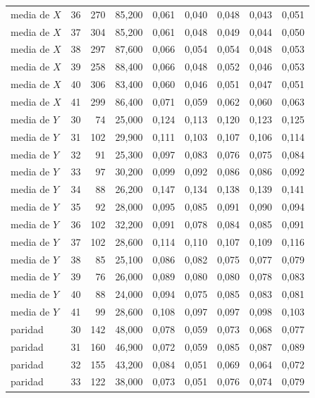 \begin{table}[htbp]
{\begin{tabular}{@{}lrrrrrrrr@{}}
        media de $X$ & 36 & 270 & 85,200 & 0,061 & 0,040 & 0,048 & 0,043 & 0,051 \\
        media de $X$ & 37 & 304 & 85,200 & 0,061 & 0,048 & 0,049 & 0,044 & 0,050 \\
        media de $X$ & 38 & 297 & 87,600 & 0,066 & 0,054 & 0,054 & 0,048 & 0,053 \\
        media de $X$ & 39 & 258 & 88,400 & 0,066 & 0,048 & 0,052 & 0,046 & 0,053 \\
        media de $X$ & 40 & 306 & 83,400 & 0,060 & 0,046 & 0,051 & 0,047 & 0,051 \\
        media de $X$ & 41 & 299 & 86,400 & 0,071 & 0,059 & 0,062 & 0,060 & 0,063 \\
        media de $Y$ & 30 & 74 & 25,000 & 0,124 & 0,113 & 0,120 & 0,123 & 0,125 \\
        media de $Y$ & 31 & 102 & 29,900 & 0,111 & 0,103 & 0,107 & 0,106 & 0,114 \\
        media de $Y$ & 32 & 91 & 25,300 & 0,097 & 0,083 & 0,076 & 0,075 & 0,084 \\
        media de $Y$ & 33 & 97 & 30,200 & 0,099 & 0,092 & 0,086 & 0,086 & 0,092 \\
        media de $Y$ & 34 & 88 & 26,200 & 0,147 & 0,134 & 0,138 & 0,139 & 0,141 \\
        media de $Y$ & 35 & 92 & 28,000 & 0,095 & 0,085 & 0,091 & 0,090 & 0,094 \\
        media de $Y$ & 36 & 102 & 32,200 & 0,091 & 0,078 & 0,084 & 0,085 & 0,091 \\
        media de $Y$ & 37 & 102 & 28,600 & 0,114 & 0,110 & 0,107 & 0,109 & 0,116 \\
        media de $Y$ & 38 & 85 & 25,100 & 0,086 & 0,082 & 0,075 & 0,077 & 0,079 \\
        media de $Y$ & 39 & 76 & 26,000 & 0,089 & 0,080 & 0,080 & 0,078 & 0,083 \\
        media de $Y$ & 40 & 88 & 24,000 & 0,094 & 0,075 & 0,085 & 0,083 & 0,081 \\
        media de $Y$ & 41 & 99 & 28,600 & 0,108 & 0,097 & 0,097 & 0,098 & 0,103 \\
        paridad & 30 & 142 & 48,000 & 0,078 & 0,059 & 0,073 & 0,068 & 0,077 \\
        paridad & 31 & 160 & 46,900 & 0,072 & 0,059 & 0,085 & 0,087 & 0,089 \\
        paridad & 32 & 155 & 43,200 & 0,084 & 0,051 & 0,069 & 0,064 & 0,072 \\
        paridad & 33 & 122 & 38,000 & 0,073 & 0,051 & 0,076 & 0,074 & 0,079 \\

\end{tabular}}
\end{table}
